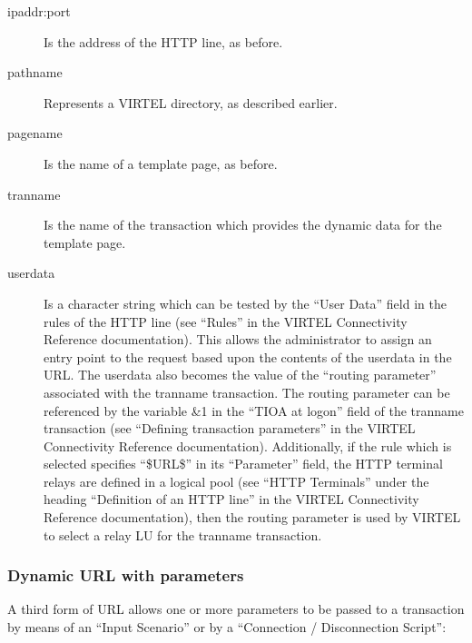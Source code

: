 \documentclass[letterpaper,10pt,english]{sphinxmanual}
\begin{document}
\begin{sphinxVerbatim}[commandchars=\\\{\}]
\end{sphinxVerbatim}
\begin{description}
\item[{ipaddr:port}] \leavevmode
Is the address of the HTTP line, as before.

\item[{pathname}] \leavevmode
Represents a VIRTEL directory, as described earlier.

\item[{pagename}] \leavevmode
Is the name of a template page, as before.

\item[{tranname}] \leavevmode
Is the name of the transaction which provides the dynamic data for
the template page.

\item[{userdata}] \leavevmode
Is a character string which can be tested by the “User Data” field in the rules of the HTTP line (see “Rules” in the VIRTEL Connectivity Reference documentation). This allows the administrator to assign an entry point to the request based upon the contents of the userdata in the URL. The userdata also becomes the value of the “routing parameter” associated with the tranname transaction. The routing parameter can be referenced by the variable \&1 in the “TIOA at logon” field of the tranname transaction (see “Defining transaction parameters” in the VIRTEL Connectivity Reference documentation). Additionally, if the rule which is selected specifies “\$URL\$” in its “Parameter” field,  the HTTP terminal relays are defined in a logical pool (see “HTTP Terminals” under the heading “Definition of an HTTP line” in the VIRTEL Connectivity Reference documentation), then the routing parameter is used by VIRTEL to select a relay LU for the tranname transaction.

\end{description}


\subsubsection{Dynamic URL with parameters}
\label{\detokenize{User_Guide:dynamic-url-with-parameters}}
A third form of URL allows one or more parameters to be passed to a transaction by means of an “Input Scenario” or by a “Connection / Disconnection Script”:
\end{document}
